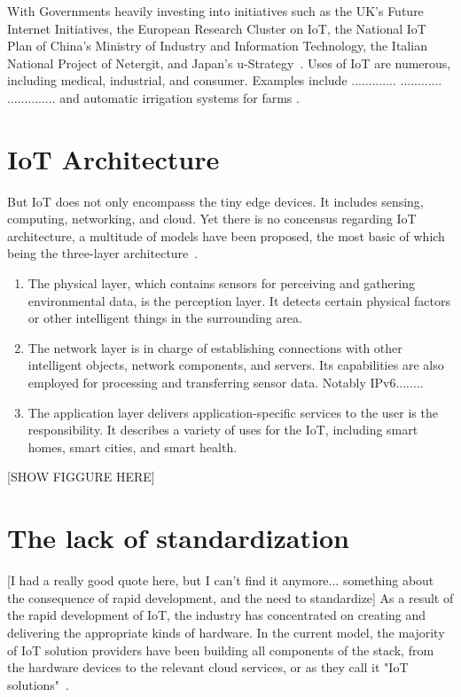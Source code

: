 With Governments heavily investing into initiatives such as the UK's Future Internet Initiatives, the European Research Cluster on IoT, the National IoT Plan of China's Ministry of Industry and Information Technology, the Italian National Project of Netergit, and Japan's u-Strategy~\cite{shin2014socio}. Uses of IoT are numerous, including medical, industrial, and consumer. Examples include ............. ............ .............. and automatic irrigation systems for farms \cite{tarange2015web}.



\section{IoT Architecture}
But IoT does not only encompasss the tiny edge devices. It includes sensing, computing, networking, and cloud. Yet there is no concensus regarding IoT architecture, a multitude of models have been proposed, the most basic of which being the three-layer architecture~\cite{sethi2017internet}. 

\begin{enumerate}
\item The physical layer, which contains sensors for perceiving and gathering environmental data, is the perception layer. It detects certain physical factors or other intelligent things in the surrounding area.

\item The network layer is in charge of establishing connections with other intelligent objects, network components, and servers. Its capabilities are also employed for processing and transferring sensor data. Notably IPv6........

\item The application layer delivers application-specific services to the user is the responsibility. It describes a variety of uses for the IoT, including smart homes, smart cities, and smart health.
\end{enumerate}

[SHOW FIGGURE HERE]



\section{The lack of standardization}
[I had a really good quote here, but I can't find it anymore... something about the consequence of rapid development, and the need to standardize]
As a result of the rapid development of IoT, the industry has concentrated on creating and delivering the appropriate kinds of hardware. In the current model, the majority of IoT solution providers have been building all components of the stack, from the hardware devices to the relevant cloud services, or as they call it "IoT solutions"~\cite{banafa2016iot}.

